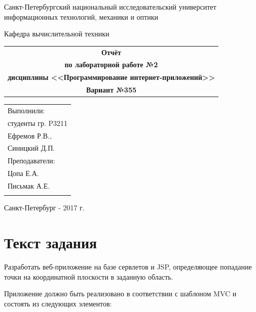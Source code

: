 \documentclass[a4paper, 12pt]{article}
\begin{document}
\begin{titlepage}
\begin{center}
{Санкт-Петербургский национальный исследовательский университет информационных технологий, механики и оптики}

Кафедра вычислительной техники
\end{center}
\vspace{50mm}
\begin{center}
\begin{tabular}{c}
\Huge{\textbf{Отчёт}}\\
\Large{\textbf{по лабораторной работе №2}}\\
\Large{\textbf{дисциплины <<Программирование интернет-приложений>>}}\\
\Large{\textbf{Вариант №355}}\\[2mm]
\end{tabular}
\end{center}
\vspace{85mm}
\begin{flushright}
\begin{tabular}{l}
Выполнили:\\
студенты гр. P3211\\
Ефремов Р.В.,\\
Синицкий Д.П.\\
Преподаватели:\\
Цопа Е.А.\\
Письмак А.Е.\\
\\
\end{tabular}
\end{flushright}
\vspace{15mm}
\begin{center}
Санкт-Петербург - 2017 г.
\end{center}
\end{titlepage}
\newpage

\section{Текст задания}

Разработать веб-приложение на базе сервлетов и JSP, определяющее попадание точки на координатной плоскости в заданную область.

Приложение должно быть реализовано в соответствии с шаблоном MVC и состоять из следующих элементов:
\end{document}
